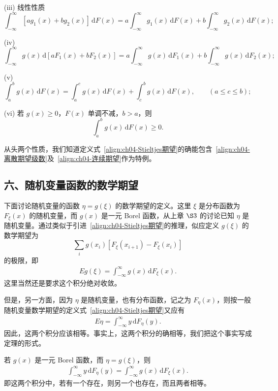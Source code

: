 \documentclass[../../main.tex]{subfiles}
\begin{document}
(iii) 线性性质
\[
\int_{-\infty}^{\infty}[ag_1(x)+bg_2(x)]\,\mathrm{d}F(x)
=a\int_{-\infty}^{\infty}g_1(x)\,\mathrm{d}F(x)+b\int_{-\infty}^{\infty}g_2(x)\,\mathrm{d}F(x);
\]

(iv)
\[
\int_{-\infty}^{\infty}g(x)\,\mathrm{d}[aF_1(x)+bF_2(x)]
=a\int_{-\infty}^{\infty}g(x)\,\mathrm{d}F_1(x)+b\int_{-\infty}^{\infty}g(x)\,\mathrm{d}F_2(x);
\]

(v)
\[
\int_a^b g(x)\,\mathrm{d}F(x)=\int_a^c g(x)\,\mathrm{d}F(x)+\int_c^b g(x)\,\mathrm{d}F(x),\qquad(a\leqslant c\leqslant b);
\]

(vi) 若 $g(x)\geqslant 0$，$F(x)$ 单调不减，$b>a$，则
\[
\int_a^b g(x)\,\mathrm{d}F(x)\geqslant 0.
\]

从头两个性质，我们知道定义式~\eqref{align:ch04-Stieltjes期望}的确能包含~\eqref{align:ch04-离散期望级数}及~\eqref{align:ch04-连续期望}作为特例。

\subsection*{六、随机变量函数的数学期望}

下面讨论随机变量的函数 $\eta=g(\xi)$ 的数学期望的定义。这里 $\xi$ 是分布函数为 $F_\xi(x)$ 的随机变量，而 $g(x)$ 是一元 Borel 函数，从上章 $\S 3$ 的讨论已知 $\eta$ 是随机变量。通过类似于引进~\eqref{align:ch04-Stieltjes期望}的推理，似应定义 $g(\xi)$ 的数学期望为
\[
\sum_i g(x_i)[F_\xi(x_{i+1})-F_\xi(x_i)]
\]
的极限，即
\begin{align}
Eg(\xi)=\int_{-\infty}^{\infty} g(x)\,\mathrm{d}F_\xi(x).\label{align:ch04-随机变量函数期望}
\end{align}
这里当然还是要求这个积分绝对收敛。

但是，另一方面，因为 $\eta$ 是随机变量，也有分布函数，记之为 $F_\eta(x)$，则按一般随机变量数学期望的定义式~\eqref{align:ch04-Stieltjes期望}又应有
\begin{align}
E\eta=\int_{-\infty}^{\infty} y\,\mathrm{d}F_\eta(y).\label{align:ch04-eta期望}
\end{align}
因此，这两个积分应该相等。事实上，这两个积分的确相等，我们把这个事实写成定理的形式。

\begin{theorem}[佚名统计学家公式]\label{theorem:ch04-佚名统计学家公式}
若 $g(x)$ 是一元 Borel 函数，而 $\eta=g(\xi)$，则
\begin{align}
\int_{-\infty}^{\infty} y\,\mathrm{d}F_\eta(y)=\int_{-\infty}^{\infty} g(x)\,\mathrm{d}F_\xi(x).\label{align:ch04-两个积分相等}
\end{align}
即这两个积分中，若有一个存在，则另一个也存在，而且两者相等。
\end{theorem}
\end{document}

